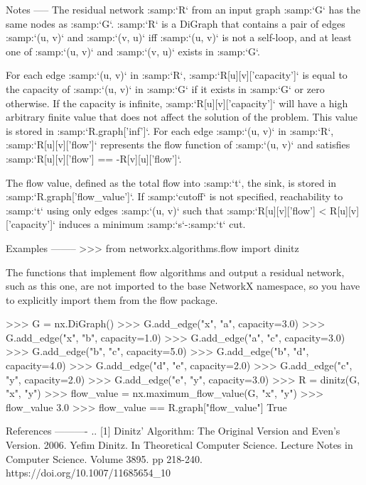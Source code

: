 \begin{DoxyVerb}
Notes
-----
The residual network :samp:`R` from an input graph :samp:`G` has the
same nodes as :samp:`G`. :samp:`R` is a DiGraph that contains a pair
of edges :samp:`(u, v)` and :samp:`(v, u)` iff :samp:`(u, v)` is not a
self-loop, and at least one of :samp:`(u, v)` and :samp:`(v, u)` exists
in :samp:`G`.

For each edge :samp:`(u, v)` in :samp:`R`, :samp:`R[u][v]['capacity']`
is equal to the capacity of :samp:`(u, v)` in :samp:`G` if it exists
in :samp:`G` or zero otherwise. If the capacity is infinite,
:samp:`R[u][v]['capacity']` will have a high arbitrary finite value
that does not affect the solution of the problem. This value is stored in
:samp:`R.graph['inf']`. For each edge :samp:`(u, v)` in :samp:`R`,
:samp:`R[u][v]['flow']` represents the flow function of :samp:`(u, v)` and
satisfies :samp:`R[u][v]['flow'] == -R[v][u]['flow']`.

The flow value, defined as the total flow into :samp:`t`, the sink, is
stored in :samp:`R.graph['flow_value']`. If :samp:`cutoff` is not
specified, reachability to :samp:`t` using only edges :samp:`(u, v)` such
that :samp:`R[u][v]['flow'] < R[u][v]['capacity']` induces a minimum
:samp:`s`-:samp:`t` cut.

Examples
--------
>>> from networkx.algorithms.flow import dinitz

The functions that implement flow algorithms and output a residual
network, such as this one, are not imported to the base NetworkX
namespace, so you have to explicitly import them from the flow package.

>>> G = nx.DiGraph()
>>> G.add_edge("x", "a", capacity=3.0)
>>> G.add_edge("x", "b", capacity=1.0)
>>> G.add_edge("a", "c", capacity=3.0)
>>> G.add_edge("b", "c", capacity=5.0)
>>> G.add_edge("b", "d", capacity=4.0)
>>> G.add_edge("d", "e", capacity=2.0)
>>> G.add_edge("c", "y", capacity=2.0)
>>> G.add_edge("e", "y", capacity=3.0)
>>> R = dinitz(G, "x", "y")
>>> flow_value = nx.maximum_flow_value(G, "x", "y")
>>> flow_value
3.0
>>> flow_value == R.graph["flow_value"]
True

References
----------
.. [1] Dinitz' Algorithm: The Original Version and Even's Version.
       2006. Yefim Dinitz. In Theoretical Computer Science. Lecture
       Notes in Computer Science. Volume 3895. pp 218-240.
       https://doi.org/10.1007/11685654_10\end{DoxyVerb}
 \mbox{\label{namespacenetworkx_1_1algorithms_1_1flow_1_1dinitz__alg_a1d07bffbc7f8b656b31b1b4bdf5fe8f9}} 
